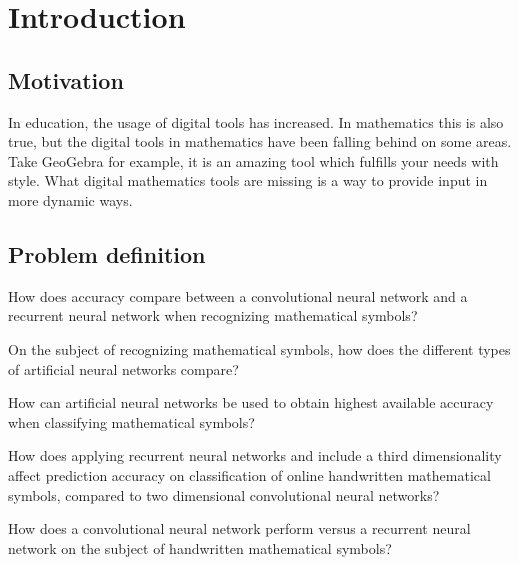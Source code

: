 \chapter{Introduction}

\section{Motivation} %

In education, the usage of digital tools has increased. In mathematics this is also true, but the digital tools in mathematics have been falling behind on some areas. Take GeoGebra for example, it is an amazing tool which fulfills your needs with style. What digital mathematics tools are missing is a way to provide input in more dynamic ways. %




\section{Problem definition} %
How does accuracy compare between a convolutional neural network and a recurrent neural network when recognizing mathematical symbols?

On the subject of recognizing mathematical symbols, how does the different types of artificial neural networks compare?

How can artificial neural networks be used to obtain highest available accuracy when classifying mathematical symbols?



How does applying recurrent neural networks and include a third dimensionality affect prediction accuracy on classification of online handwritten mathematical symbols, compared to two dimensional convolutional neural networks?

How does a convolutional neural network perform versus a recurrent neural network on the subject of handwritten mathematical symbols?

